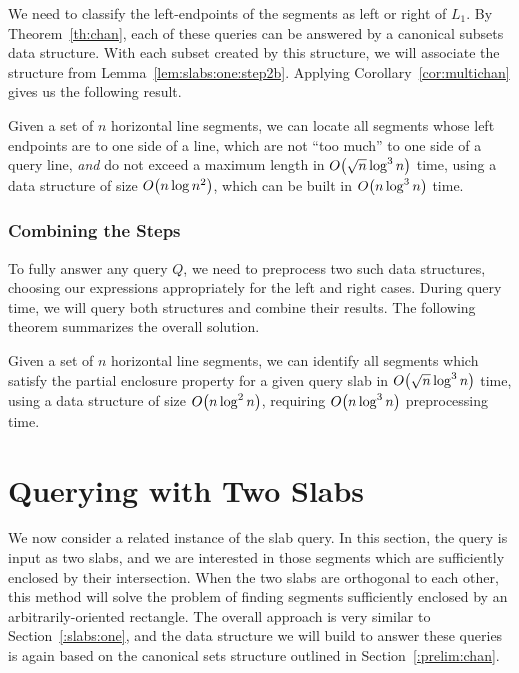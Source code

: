 We need to classify the left-endpoints of the segments as left or right of $L_1$. 
By Theorem~\ref{th:chan}, each of these queries can be answered by a canonical subsets data structure.
With each subset created by this structure, we will associate the structure from Lemma~\ref{lem:slabs:one:step2b}. 
Applying Corollary~\ref{cor:multichan} gives us the following result.

\begin{lemma}
\label{lem:slabs:one:step3}
Given a set of $n$ horizontal line segments, we can locate all segments whose left endpoints are to one side of a line, which are not ``too much'' to one side of a query line, \emph{and} do not exceed a maximum length in $O\!\left(\sqrt{n}\log^3{n}\right)$ time, using a data structure of size $O\!\left(n\log{n}^2\right)$, which can be built in $O\!\left(n\log^3{n}\right)$ time.
\end{lemma}

\subsubsection{Combining the Steps}

To fully answer any query $Q$, we need to preprocess two such data structures, choosing our expressions appropriately for the left and right cases.
During query time, we will query both structures and combine their results.
The following theorem summarizes the overall solution.

\begin{theorem}
\label{th:slabs:one}
Given a set of $n$ horizontal line segments, we can identify all segments which satisfy the partial enclosure property for a given query slab in $O\!\left(\sqrt{n}\log^3{n}\right)$ time, using a data structure of size $O\!\left(n\log^2{n}\right)$, requiring $O\!\left(n\log^3{n}\right)$ preprocessing time.
\end{theorem}


\section{Querying with Two Slabs}
\label{:slabs:two}

We now consider a related instance of the slab query. 
In this section, the query is input as two slabs, and we are interested in those segments which are sufficiently enclosed by their intersection. 
When the two slabs are orthogonal to each other, this method will solve the problem of finding segments sufficiently enclosed by an arbitrarily-oriented rectangle.  
The overall approach is very similar to Section~\ref{:slabs:one}, and the data structure we will build to answer these queries is again based on the canonical sets structure outlined in Section~\ref{:prelim:chan}.


